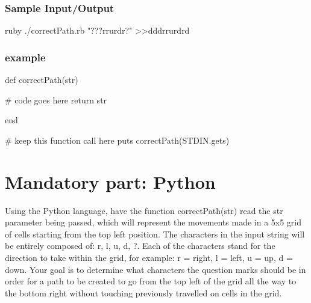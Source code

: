 \documentclass{42-en}
\begin{document}
    \subsection{Sample Input/Output}

           \begin{42console}
            ruby ./correctPath.rb "???rrurdr?"
            >>dddrrurdrd
            \end{42console}

    \subsection{example}

           \begin{42ccode}
                def correctPath(str)

                # code goes here
                return str 
                         
                end
                   
                # keep this function call here    
                puts correctPath(STDIN.gets) 
            \end{42ccode}

\chapter{Mandatory part: Python}

    Using the Python language, have the function correctPath(str) read the str 
    parameter being passed, which will represent the movements made in a 5x5 
    grid of cells starting from the top left position. The characters in the 
    input string will be entirely composed of: r, l, u, d, ?. Each of the 
    characters stand for the direction to take within the grid, for example: 
    r = right, l = left, u = up, d = down. Your goal is to determine what 
    characters the question marks should be in order for a path to be created
     to go from the top left of the grid all the way to the bottom 
     right without touching previously travelled on cells in the grid. 
\end{document}

